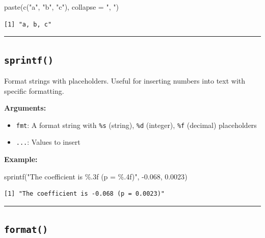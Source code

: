 \documentclass[
  letterpaper,
  DIV=11,
  numbers=noendperiod]{scrreprt}
\newenvironment{Shaded}{\begin{snugshade}}{\end{snugshade}}
\newcommand{\AttributeTok}[1]{\textcolor[rgb]{0.40,0.45,0.13}{#1}}
\newcommand{\FloatTok}[1]{\textcolor[rgb]{0.68,0.00,0.00}{#1}}
\newcommand{\FunctionTok}[1]{\textcolor[rgb]{0.28,0.35,0.67}{#1}}
\newcommand{\NormalTok}[1]{\textcolor[rgb]{0.00,0.23,0.31}{#1}}
\newcommand{\SpecialCharTok}[1]{\textcolor[rgb]{0.37,0.37,0.37}{#1}}
\newcommand{\StringTok}[1]{\textcolor[rgb]{0.13,0.47,0.30}{#1}}
\providecommand{\tightlist}{%
  \setlength{\itemsep}{0pt}\setlength{\parskip}{0pt}}
\begin{document}
\begin{Shaded}
\begin{Highlighting}[]
\FunctionTok{paste}\NormalTok{(}\FunctionTok{c}\NormalTok{(}\StringTok{"a"}\NormalTok{, }\StringTok{"b"}\NormalTok{, }\StringTok{"c"}\NormalTok{), }\AttributeTok{collapse =} \StringTok{", "}\NormalTok{)}
\end{Highlighting}
\end{Shaded}

\begin{verbatim}
[1] "a, b, c"
\end{verbatim}

\begin{center}\rule{0.5\linewidth}{0.5pt}\end{center}

\subsection{\texorpdfstring{\texttt{sprintf()}}{sprintf()}}\label{sprintf}

Format strings with placeholders. Useful for inserting numbers into text
with specific formatting.

\textbf{Arguments:}

\begin{itemize}
\tightlist
\item
  \texttt{fmt}: A format string with \texttt{\%s} (string), \texttt{\%d}
  (integer), \texttt{\%f} (decimal) placeholders
\item
  \texttt{...}: Values to insert
\end{itemize}

\textbf{Example:}

\begin{Shaded}
\begin{Highlighting}[]
\FunctionTok{sprintf}\NormalTok{(}\StringTok{"The coefficient is \%.3f (p = \%.4f)"}\NormalTok{, }\SpecialCharTok{{-}}\FloatTok{0.068}\NormalTok{, }\FloatTok{0.0023}\NormalTok{)}
\end{Highlighting}
\end{Shaded}

\begin{verbatim}
[1] "The coefficient is -0.068 (p = 0.0023)"
\end{verbatim}

\begin{center}\rule{0.5\linewidth}{0.5pt}\end{center}

\subsection{\texorpdfstring{\texttt{format()}}{format()}}\label{format}
\end{document}
